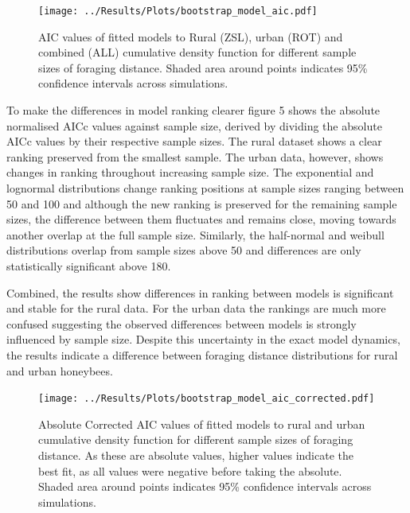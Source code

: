 \documentclass[11pt]{article}
\begin{document}
\begin{linenumbers}
\begin{figure}[H]
	\texttt{[image: ../Results/Plots/bootstrap\_model\_aic.pdf]}
	\caption{AIC values of fitted models to Rural (ZSL), urban (ROT) and combined (ALL) cumulative density function for different sample sizes of foraging distance. Shaded area around points indicates 95\% confidence intervals across simulations.}
\end{figure}

To make the differences in model ranking clearer figure 5 shows the absolute normalised AICc values against sample size, derived by dividing the absolute AICc values by their respective sample sizes. The rural dataset shows a clear ranking preserved from the smallest sample. The urban data, however, shows changes in ranking throughout increasing sample size. The exponential and lognormal distributions change ranking positions at sample sizes ranging between 50 and 100 and although the new ranking is preserved for the remaining sample sizes, the difference between them fluctuates and remains close, moving towards another overlap at the full sample size. Similarly, the half-normal and weibull distributions overlap from sample sizes above 50 and differences are only statistically significant above 180.\par 

Combined, the results show differences in ranking between models is significant and stable for the rural data. For the urban data the rankings are much more confused suggesting the observed differences between models is strongly influenced by sample size. Despite this uncertainty in the exact model dynamics, the results indicate a difference between foraging distance distributions for rural and urban honeybees.  

\begin{figure}[H]
	\texttt{[image: ../Results/Plots/bootstrap\_model\_aic\_corrected.pdf]}
	\caption{Absolute Corrected AIC values of fitted models to rural and urban cumulative density function for different sample sizes of foraging distance. As these are absolute values, higher values indicate the best fit, as all values were negative before taking the absolute. Shaded area around points indicates 95\% confidence intervals across simulations.}
\end{figure}

\end{linenumbers}
\end{document}
